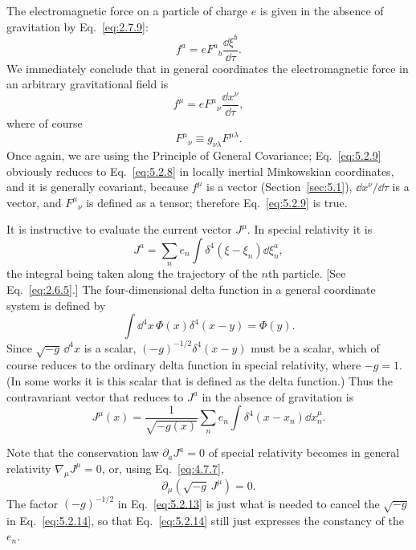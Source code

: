 The electromagnetic force on a particle of charge \(e\) is given in the
absence of gravitation by Eq.~\eqref{eq:2.7.9}:
\begin{equation}
  f^a=eF^a{}_b\frac{\dd\xi^b}{\dd\tau}.
  \tag{5.2.8}\label{eq:5.2.8}
\end{equation}
We immediately conclude that in general coordinates the electromagnetic
force in an arbitrary gravitational field is
\begin{equation}
  f^\mu=eF^\mu{}_\nu\frac{\dd x^\nu}{\dd\tau},
  \tag{5.2.9}\label{eq:5.2.9}
\end{equation}
where of course
\begin{equation}
  F^\mu{}_\nu
  \equiv
  g_{\nu\lambda}F^{\mu\lambda}.
  \tag{5.2.10}\label{eq:5.2.10}
\end{equation}
Once again, we are using the Principle of General Covariance;
Eq.~\eqref{eq:5.2.9} obviously reduces to Eq.~\eqref{eq:5.2.8} in locally
inertial Minkowskian coordinates, and it is generally covariant, because
\(f^\mu\) is a vector (Section~\ref{sec:5.1}),
\(\dd x^\nu/\dd\tau\) is a vector, and \(F^\mu{}_\nu\) is defined as a
tensor; therefore Eq.~\eqref{eq:5.2.9} is true.

It is instructive to evaluate the current vector \(J^\mu\). In special
relativity it is
\begin{equation}
  J^a
  =
  \sum_n e_n
  \int
  \delta^4\!\left(\xi-\xi_n\right)\dd\xi_n^a,
  \tag{5.2.11}\label{eq:5.2.11}
\end{equation}
the integral being taken along the trajectory of the \(n\)th particle. [See
Eq.~\eqref{eq:2.6.5}.] The four-dimensional delta function in a general
coordinate system is defined by
\begin{equation}
  \int
  \dd^4x\,\Phi(x)\delta^4(x-y)
  =
  \Phi(y).
  \tag{5.2.12}\label{eq:5.2.12}
\end{equation}
Since \(\sqrt{-g}\,\dd^4x\) is a scalar,
\((-g)^{-1/2}\delta^4(x-y)\) must be a scalar, which of course reduces to
the ordinary delta function in special relativity, where \(-g=1\). (In some
works it is this scalar that is defined as the delta function.) Thus the
contravariant vector that reduces to \(J^a\) in the absence of gravitation
is
\begin{equation}
  J^\mu(x)
  =
  \frac{1}{\sqrt{-g(x)}}
  \sum_n e_n
  \int
  \delta^4\!\left(x-x_n\right)\dd x_n^\mu.
  \tag{5.2.13}\label{eq:5.2.13}
\end{equation}

Note that the conservation law \(\partial_aJ^a=0\) of special relativity
becomes in general relativity \(\nabla_\mu J^\mu=0\), or, using
Eq.~\eqref{eq:4.7.7},
\begin{equation}
  \partial_\mu\!\left(\sqrt{-g}\,J^\mu\right)=0.
  \tag{5.2.14}\label{eq:5.2.14}
\end{equation}
The factor \((-g)^{-1/2}\) in Eq.~\eqref{eq:5.2.13} is just what is needed
to cancel the \(\sqrt{-g}\) in Eq.~\eqref{eq:5.2.14}, so that
Eq.~\eqref{eq:5.2.14} still just expresses the constancy of the \(e_n\).
